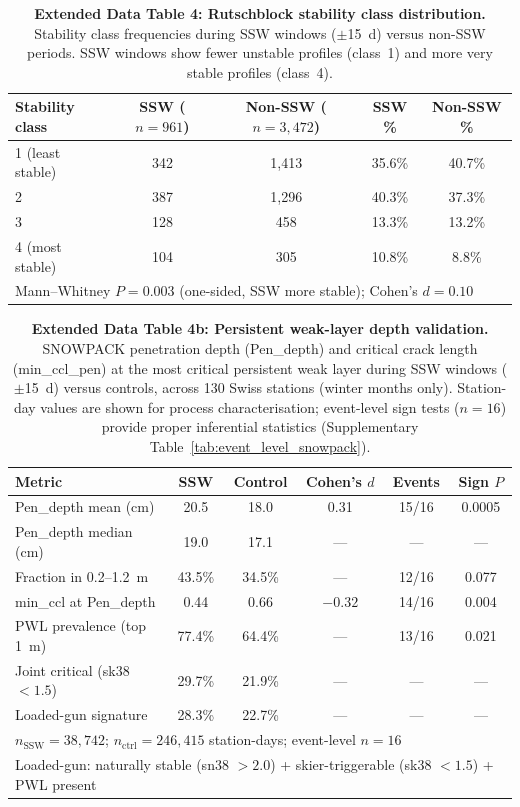 \documentclass[11pt,letterpaper]{article}
\begin{document}
\begin{table}[!ht]
\centering
\caption{\textbf{Extended Data Table 4: Rutschblock stability class distribution.}
Stability class frequencies during SSW windows ($\pm$15~d) versus non-SSW periods. SSW windows show fewer unstable profiles (class~1) and more very stable profiles (class~4).}
\label{tab:rutsch}
\small
\begin{tabular}{lcccc}
\toprule
Stability class & SSW ($n = 961$) & Non-SSW ($n = 3{,}472$) & SSW \% & Non-SSW \% \\
\midrule
1 (least stable) & 342 & 1,413 & 35.6\% & 40.7\% \\
2 & 387 & 1,296 & 40.3\% & 37.3\% \\
3 & 128 & 458 & 13.3\% & 13.2\% \\
4 (most stable) & 104 & 305 & 10.8\% & 8.8\% \\
\midrule
\multicolumn{5}{l}{Mann--Whitney $P = 0.003$ (one-sided, SSW more stable); Cohen's $d = 0.10$} \\
\bottomrule
\end{tabular}
\end{table}

\begin{table}[!ht]
\centering
\caption{\textbf{Extended Data Table 4b: Persistent weak-layer depth validation.}
SNOWPACK penetration depth (Pen\_depth) and critical crack length (min\_ccl\_pen) at the most critical persistent weak layer during SSW windows ($\pm$15~d) versus controls, across 130 Swiss stations (winter months only). Station-day values are shown for process characterisation; event-level sign tests ($n = 16$) provide proper inferential statistics (Supplementary Table~\ref{tab:event_level_snowpack}).}
\label{tab:pwl_depth}
\small
\begin{tabular}{lccccc}
\toprule
Metric & SSW & Control & Cohen's $d$ & Events & Sign $P$ \\
\midrule
Pen\_depth mean (cm) & 20.5 & 18.0 & 0.31 & 15/16 & 0.0005 \\
Pen\_depth median (cm) & 19.0 & 17.1 & --- & --- & --- \\
Fraction in 0.2--1.2~m & 43.5\% & 34.5\% & --- & 12/16 & 0.077 \\
min\_ccl at Pen\_depth & 0.44 & 0.66 & $-0.32$ & 14/16 & 0.004 \\
PWL prevalence (top 1~m) & 77.4\% & 64.4\% & --- & 13/16 & 0.021 \\
Joint critical (sk38 $< 1.5$) & 29.7\% & 21.9\% & --- & --- & --- \\
Loaded-gun signature & 28.3\% & 22.7\% & --- & --- & --- \\
\midrule
\multicolumn{6}{l}{$n_{\mathrm{SSW}} = 38{,}742$; $n_{\mathrm{ctrl}} = 246{,}415$ station-days; event-level $n = 16$} \\
\multicolumn{6}{l}{Loaded-gun: naturally stable (sn38 $> 2.0$) + skier-triggerable (sk38 $< 1.5$) + PWL present} \\
\bottomrule
\end{tabular}
\end{table}
\end{document}
